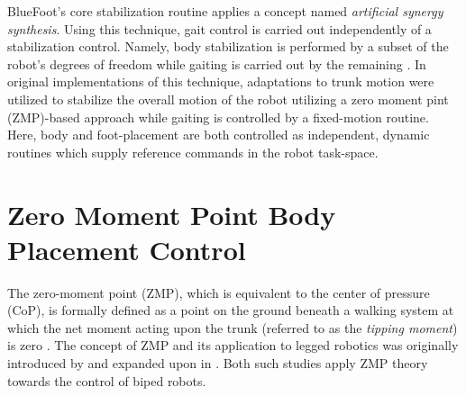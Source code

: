 		BlueFoot's core stabilization routine applies a concept named \emph{artificial synergy synthesis}. Using this technique, gait control is carried out independently of a stabilization control. Namely, body stabilization is performed by a subset of the robot's degrees of freedom while gaiting is carried out by the remaining \cite{Vuko1972,Yamaguchi1993}. In original implementations of this technique, adaptations to trunk motion were utilized to stabilize the overall motion of the robot utilizing a zero moment pint (ZMP)-based approach while gaiting is controlled by a fixed-motion routine. Here, body and foot-placement are both controlled as independent, dynamic routines which supply reference commands in the robot task-space. %




	\section{Zero Moment Point Body Placement Control}

		The zero-moment point (ZMP), which is equivalent to the center of pressure (CoP), is formally defined as a point on the ground beneath a walking system at which the net moment acting upon the trunk (referred to as the \emph{tipping moment}) is zero \cite{Sardain2004}. The concept of ZMP and its application to legged robotics was originally introduced by \cite{Vuko1972} and expanded upon in \cite{Goswami1999}. Both such studies apply ZMP theory towards the control of biped robots.

